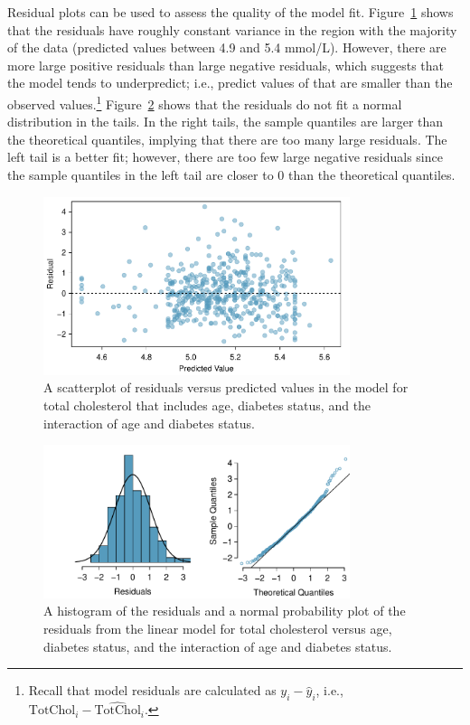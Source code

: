 Residual plots can be used to assess the quality of the model fit. Figure~\ref{nhanesAgeDiabetesCholResidPlot} shows that the residuals have roughly constant variance in the region with the majority of the data (predicted values between 4.9 and 5.4 mmol/L). However, there are more large positive residuals than large negative residuals, which suggests that the model tends to underpredict; i.e., predict values of  that are smaller than the observed values.\footnote{Recall that model residuals are calculated as $y_i - \hat{y}_i$, i.e., $\text{TotChol}_i - \widehat{\text{TotChol}}_i$.} Figure~\ref{nhanesAgeDiabetesCholResidNormPlot} shows that the residuals do not fit a normal distribution in the tails. In the right tails, the sample quantiles are larger than the theoretical quantiles, implying that there are too many large residuals. The left tail is a better fit; however, there are too few large negative residuals since the sample quantiles in the left tail are closer to 0 than the theoretical quantiles.

\begin{figure}[h!]
	\centering
	\includegraphics[width=0.8\textwidth]
	{ch_multiple_linear_regression_oi_biostat/figures/nhanesAgeDiabetesCholResidPlot/nhanesAgeDiabetesCholResidPlot.pdf}
	\caption{A scatterplot of residuals versus predicted values in the model for total cholesterol that includes age, diabetes status, and the interaction of age and diabetes status.}
	\label{nhanesAgeDiabetesCholResidPlot}
\end{figure}

\begin{figure}[h!]
	\centering
	\includegraphics[width=0.8\textwidth]
	{ch_multiple_linear_regression_oi_biostat/figures/nhanesAgeDiabetesCholResidNormPlot/nhanesAgeDiabetesCholResidNormPlot.pdf}
    \caption{A histogram of the residuals and a normal probability plot of the residuals from the linear model for total cholesterol versus age, diabetes status, and the interaction of age and diabetes status.}
   	\label{nhanesAgeDiabetesCholResidNormPlot}
\end{figure}


